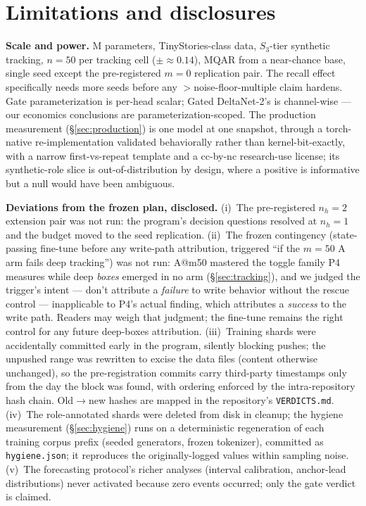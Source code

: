 \documentclass[10pt]{article}
\begin{document}
\section{Limitations and disclosures}\label{sec:limits}
\textbf{Scale and power.} \tgParamsM{}M parameters, TinyStories-class data, $S_3$-tier synthetic
tracking, $n{=}50$ per tracking cell ($\pm\approx0.14$), MQAR from a near-chance base, single seed
except the pre-registered $m{=}0$ replication pair. The recall effect specifically needs more
seeds before any $>$noise-floor-multiple claim hardens. Gate parameterization is per-head scalar;
Gated DeltaNet-2's is channel-wise --- our economics conclusions are parameterization-scoped. The
production measurement (\S\ref{sec:production}) is one model at one snapshot, through a
torch-native re-implementation validated behaviorally rather than kernel-bit-exactly, with a
narrow first-vs-repeat template and a cc-by-nc research-use license; its synthetic-role slice is
out-of-distribution by design, where a positive is informative but a null would have been
ambiguous.

\textbf{Deviations from the frozen plan, disclosed.} (i)~The pre-registered $n_h{=}2$ extension
pair was not run: the program's decision questions resolved at $n_h{=}1$ and the budget moved to
the seed replication. (ii)~The frozen contingency (state-passing fine-tune \citep{buitrago2025length}
before any write-path attribution, triggered ``if the $m{=}50$ A arm fails deep tracking'') was not
run: A@m50 mastered the toggle family P4 measures while deep \emph{boxes} emerged in no arm
(\S\ref{sec:tracking}), and we judged the trigger's intent --- don't attribute a \emph{failure} to
write behavior without the rescue control --- inapplicable to P4's actual finding, which attributes
a \emph{success} to the write path. Readers may weigh that judgment; the fine-tune remains the
right control for any future deep-boxes attribution. (iii)~Training shards were accidentally
committed early in the program, silently blocking pushes; the unpushed range was rewritten to
excise the data files (content otherwise unchanged), so the pre-registration commits carry
third-party timestamps only from the day the block was found, with ordering enforced by the
intra-repository hash chain. Old$\to$new hashes are mapped in the repository's
\texttt{VERDICTS.md}. (iv)~The role-annotated shards were deleted from disk in cleanup; the
hygiene measurement (\S\ref{sec:hygiene}) runs on a deterministic regeneration of each training
corpus prefix (seeded generators, frozen tokenizer), committed as \texttt{hygiene.json}; it
reproduces the originally-logged values within sampling noise. (v)~The forecasting protocol's
richer analyses (interval calibration, anchor-lead distributions) never activated because zero
events occurred; only the gate verdict is claimed.
\end{document}
